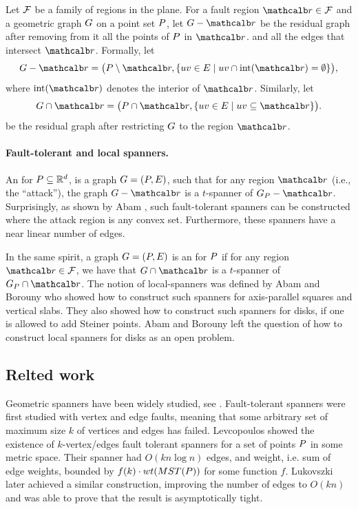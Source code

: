 \documentclass[12pt]{article}%
\begin{document}
Let $\mathcal{F}$ be a family of regions in the plane. For a fault region
$\region \in \FF$ and a geometric graph $G$ on a point set $P$, let
$\G \gminus \region$ be the residual graph after removing from it all
the points of $P$ in $\region$. and all the edges that intersect
$\region$.  Formally, let
\begin{equation*}
    \G \gminus \region%
    =%
    \bigl( \PS \setminus \region, \Set{ uv \in \EG }{ uv \cap
       \interiorX{\region} = \emptyset} \bigr),
\end{equation*}
where $\interiorX{\region}$ denotes the interior of
$\region$. Similarly, let
\begin{equation*}
    \restrictY{\G}{\region}%
    =%
    \bigl( \PS \cap {\region},
    \Set{uv \in \EG}{ uv \subseteq {\region} } \bigr).
\end{equation*}
be the residual graph after restricting $G$ to the region $\region$.

\paragraph{Fault-tolerant and local spanners.}

An  for $P\subseteq \mathbb{R}^d$, is
a graph $G=(P, E)$, such that for any region $\region$ (i.e., the
``attack''), the graph $\G \gminus \region$ is a $t$-spanner of
$\G_\PS - \region$. Surprisingly, as shown by Abam \etal
\cite{abfg-rftgs-09}, such fault-tolerant spanners can be constructed
where the attack region is any convex set. Furthermore, these spanners
have a near linear number of edges.

In the same spirit, a graph $G=(P, E)$ is an  for $P$ if for any region $\region \in \FF$, we have
that $\restrictY{\G}{\region}$ is a $t$-spanner of
$\G_\PS \cap \region$.  The notion of local-spanners was defined by
Abam and Borouny \cite{ab-lgs-21} who showed how to construct such
spanners for axis-parallel squares and vertical slabs. They also
showed how to construct such spanners for disks, if one is allowed to
add Steiner points. Abam and Borouny left the question of how to
construct local spanners for disks as an open problem.

\subsection*{Relted work}

Geometric spanners have been widely studied, see
\cite{ns-gsn-07}. Fault-tolerant spanners were first studied with
vertex and edge faults, meaning that some arbitrary set of maximum
size $k$ of vertices and edges has failed. Levcopoulos \etal
\cite{lns-iacfts-02} showed the existence of $k$-vertex/edges fault
tolerant spanners for a set of points $P$ in some metric
space. Their spanner had $O(kn\log n)$ edges, and weight, i.e. sum of
edge weights, bounded by $f(k)\cdot wt(MST(P))$ for some function
$f$. Lukovszki \cite{l-nrftgs-99} later achieved a similar
construction, improving the number of edges to $O(kn)$ and was able to
prove that the result is asymptotically tight.
\end{document}

